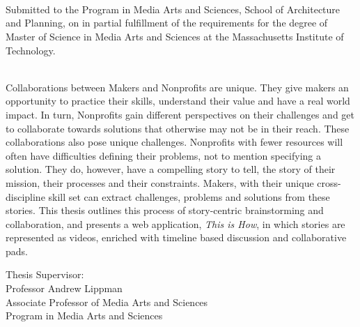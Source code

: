 \begin{titlepage}
      {\setlength{\parindent}{0cm}
        \large  


        \hfill


        \begingroup

            \color{Maroon}\spacedallcaps{\myTitle} \\ 
            \mySubtitle \\ 

            \bigskip
        \endgroup

        \spacedlowsmallcaps{\myName}\\ \medskip

   Submitted to the Program in Media Arts and Sciences, School of Architecture and Planning, on \myTime in partial fulfillment of the requirements for the degree of Master of Science in Media Arts and Sciences at the Massachusetts Institute of Technology. \\ 

\bigskip
{}\\ \medskip

Collaborations between Makers and Nonprofits are unique. They give makers an opportunity to practice their skills, understand their value and have a real world impact. In turn, Nonprofits gain different perspectives on their challenges and get to collaborate towards solutions that otherwise may not be in their reach. These collaborations also pose unique challenges. Nonprofits with fewer resources will often have difficulties defining their problems, not to mention specifying a solution. They do, however, have a compelling story to tell, the story of their mission, their processes and their constraints. Makers, with their unique cross-discipline skill set can extract challenges, problems and solutions from these stories. This thesis outlines this process of story-centric brainstorming and collaboration, and presents a web application, \textit{This is How}, in which stories are represented as videos, enriched with timeline based discussion and collaborative pads.  
\vfill


Thesis Supervisor:\\
Professor Andrew Lippman\\
Associate Professor of Media Arts and Sciences\\
Program in Media Arts and Sciences

        }
\end{titlepage}   
